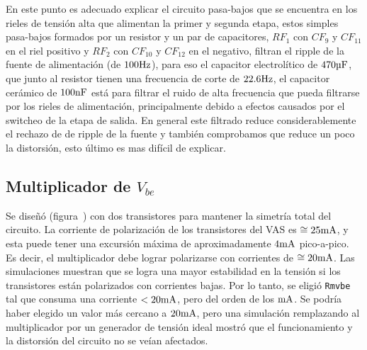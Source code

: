 En este punto es adecuado explicar el circuito pasa-bajos que se encuentra en los rieles de tensión alta que alimentan la primer y segunda etapa, estos simples pasa-bajos formados por un resistor y un par de capacitores, $RF_{1}$ con $CF_{9}$ y $CF_{11}$ en el riel positivo y $RF_{2}$ con $CF_{10}$ y $CF_{12}$ en el negativo, filtran el ripple de la fuente de alimentación (de $100 \si[per-mode=symbol]{\hertz}$), para eso el capacitor electrolítico de $470 \si[per-mode=symbol]{\micro\farad}$, que junto al resistor tienen una frecuencia de corte de $22.6 \si[per-mode=symbol]{\hertz}$, el capacitor cerámico de $100 \si[per-mode=symbol]{\nano\farad}$ está para filtrar el ruido de alta frecuencia que pueda filtrarse por los rieles de alimentación, principalmente debido a efectos causados por el switcheo de la etapa de salida. En general este filtrado reduce considerablemente el rechazo de de ripple de la fuente y también comprobamos que reduce un poco la distorsión, esto último es mas difícil de explicar.


\clearpage


\subsection{Multiplicador de $V_{be}$}


Se diseñó (figura~) con dos transistores para mantener la simetría total del circuito. La corriente de polarización de los transistores del VAS es $\cong 25 \si[per-mode=symbol]{\milli\ampere}$, y esta puede tener una excursión máxima de aproximadamente $4 \si[per-mode=symbol]{\milli\ampere}$ pico-a-pico. Es decir, el multiplicador debe lograr polarizarse con corrientes de $\cong 20 \si[per-mode=symbol]{\milli\ampere}$. Las simulaciones muestran que se logra una mayor estabilidad en la tensión si los transistores están polarizados con corrientes bajas. Por lo tanto, se eligió \texttt{Rmvbe} tal que consuma una corriente $< 20 \si[per-mode=symbol]{\milli\ampere}$, pero del orden de los $\si[per-mode=symbol]{\milli\ampere}$. Se podría haber elegido un valor más cercano a $20 \si[per-mode=symbol]{\milli\ampere}$, pero una simulación remplazando al multiplicador por un generador de tensión ideal mostró que el funcionamiento y la distorsión del circuito no se veían afectados. 


